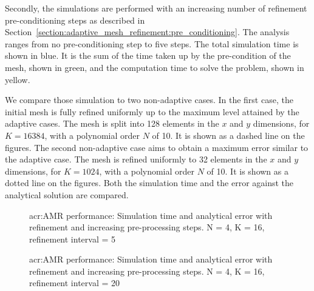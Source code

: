 Secondly, the simulations are performed with an increasing number of refinement pre-conditioning
steps as described in Section~\ref{section:adaptive_mesh_refinement:pre_conditioning}. The analysis
ranges from no pre-conditioning step to five steps. The total simulation time is shown in blue. It
is the sum of the time taken up by the pre-condition of the mesh, shown in green, and the
computation time to solve the problem, shown in yellow. 

We compare those simulation to two non-adaptive cases. In the first case, the initial mesh is fully
refined uniformly up to the maximum level attained by the adaptive cases. The mesh is split into 128
elements in the \(x\) and \(y\) dimensions, for \(K = 16384\), with a polynomial order \(N\) of 10.
It is shown as a dashed line on the figures. The second non-adaptive case aims to obtain a maximum
error similar to the adaptive case. The mesh is refined uniformly to 32 elements in the \(x\) and
\(y\) dimensions, for \(K = 1024\), with a polynomial order \(N\) of 10. It is shown as a dotted
line on the figures. Both the simulation time and the error against the analytical solution
are compared.


\begin{figure}[H]
	\centering
	\caption{\Acrlong{acr:AMR} performance: Simulation time and analytical error with refinement and increasing pre-processing steps. N = 4, K = 16, refinement interval = 5}\label{fig:adaptivity_efficiency_C5}
\end{figure}

\begin{figure}[H]
	\centering
	\hfill
	\caption{\Acrlong{acr:AMR} performance: Simulation time and analytical error with refinement and increasing pre-processing steps. N = 4, K = 16, refinement interval = 20}\label{fig:adaptivity_efficiency_C20}
\end{figure}

